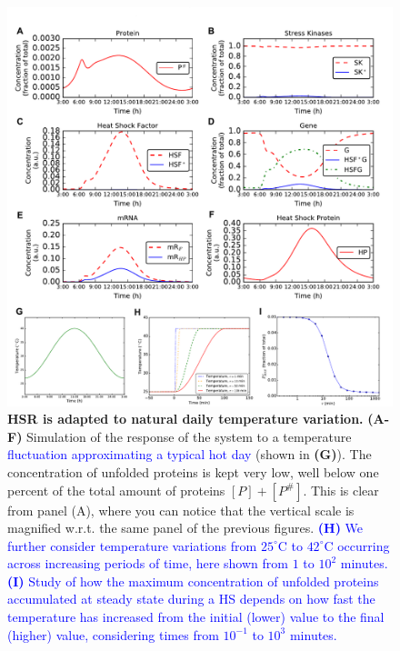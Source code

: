 \documentclass[oneside, 10pt, a4paper, twocolumn]{article}
\begin{document}
\begin{figure}
\centering
\includegraphics[width=\textwidth]{Figure4_Paper.pdf}
\caption{\small{\textbf{HSR is adapted to natural daily temperature variation.} \textbf{(A-F)} Simulation of the response of the system to a temperature \textcolor{blue}{fluctuation approximating a typical hot day} (shown in \textbf{(G)}). The concentration of unfolded proteins is kept very low, well below one percent of the total amount of proteins $\left[P\right]+\left[P^\#\right]$. This is clear from panel (A), where you can notice that the vertical scale is magnified w.r.t. the same panel of the previous figures. \textcolor{blue}{\textbf{(H)} We further consider temperature variations from $25^\circ\text{C}$ to $42^\circ\text{C}$ occurring across increasing periods of time, here shown from $1$ to $10^{2}$ minutes. \textbf{(I)} Study of how the maximum concentration of unfolded proteins accumulated at steady state during a HS depends on how fast the temperature has increased from the initial (lower) value to the final (higher) value, considering times from $10^{-1}$ to $10^{3}$ minutes.}}
}
\label{Figure4label}
\end{figure}

\clearpage


\appendix
\end{document}
